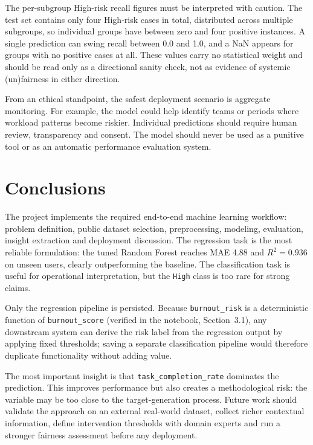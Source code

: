 \documentclass[conference]{IEEEtran}
\begin{document}
The per-subgroup High-risk recall figures must be interpreted with caution.
The test set contains only four High-risk cases in total, distributed across
multiple subgroups, so individual groups have between zero and four positive
instances. A single prediction can swing recall between 0.0 and 1.0, and a NaN
appears for groups with no positive cases at all. These values carry no
statistical weight and should be read only as a directional sanity check, not
as evidence of systemic (un)fairness in either direction.

From an ethical standpoint, the safest deployment scenario is aggregate
monitoring. For example, the model could help identify teams or periods where
workload patterns become riskier. Individual predictions should require human
review, transparency and consent. The model should never be used as a punitive
tool or as an automatic performance evaluation system.

\section{Conclusions}

The project implements the required end-to-end machine learning workflow:
problem definition, public dataset selection, preprocessing, modeling,
evaluation, insight extraction and deployment discussion. The regression task is
the most reliable formulation: the tuned Random Forest reaches MAE 4.88 and
$R^2=0.936$ on unseen users, clearly outperforming the baseline. The
classification task is useful for operational interpretation, but the
\texttt{High} class is too rare for strong claims.

Only the regression pipeline is persisted. Because \texttt{burnout\_risk} is a
deterministic function of \texttt{burnout\_score} (verified in the notebook,
Section~3.1), any downstream system can derive the risk label from the regression
output by applying fixed thresholds; saving a separate classification pipeline
would therefore duplicate functionality without adding value.

The most important insight is that \texttt{task\_completion\_rate} dominates the
prediction. This improves performance but also creates a methodological risk:
the variable may be too close to the target-generation process. Future work
should validate the approach on an external real-world dataset, collect richer
contextual information, define intervention thresholds with domain experts and
run a stronger fairness assessment before any deployment.
\end{document}

